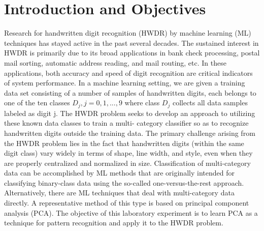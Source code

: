 \section{Introduction and Objectives}
\label{sect:introduction}
Research for handwritten digit recognition (HWDR) by machine learning (ML) techniques has
stayed active in the past several decades. The sustained interest in HWDR is primarily due to
its broad applications in bank check processing, postal mail sorting, automatic address reading,
and mail routing, etc. In these applications, both accuracy and speed of digit recognition are
critical indicators of system performance. In a machine learning setting, we are given a training
data set consisting of a number of samples of handwritten digits, each belongs to one of the ten
classes ${D_j , j = 0, 1, ..., 9}$ where class $D_j$ collects all data samples labeled as digit j. The HWDR
problem seeks to develop an approach to utilizing these known data classes to train a multi-
category classifier so as to recognize handwritten digits outside the training data. The primary
challenge arising from the HWDR problem lies in the fact that handwritten digits (within the
same digit class) vary widely in terms of shape, line width, and style, even when they are
properly centralized and normalized in size.
Classification of multi-category data can be accomplished by ML methods that are originally
intended for classifying binary-class data using the so-called one-versus-the-rest approach.
Alternatively, there are ML techniques that deal with multi-category data directly. A
representative method of this type is based on principal component analysis (PCA). The objective of this
laboratory experiment is to learn PCA as a technique for pattern recognition and apply it to the
HWDR problem.
